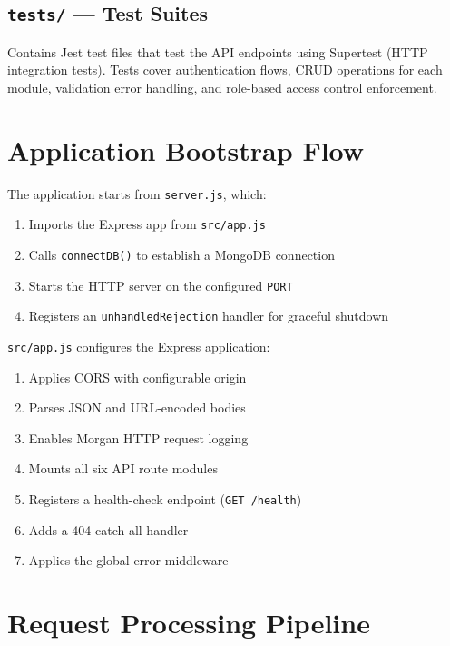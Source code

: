 \documentclass[12pt,a4paper]{article}
\begin{document}
\subsection{\texttt{tests/} --- Test Suites}

Contains Jest test files that test the API endpoints using Supertest (HTTP integration tests). Tests cover authentication flows, CRUD operations for each module, validation error handling, and role-based access control enforcement.

\section{Application Bootstrap Flow}

The application starts from \texttt{server.js}, which:

\begin{enumerate}
  \item Imports the Express app from \texttt{src/app.js}
  \item Calls \texttt{connectDB()} to establish a MongoDB connection
  \item Starts the HTTP server on the configured \texttt{PORT}
  \item Registers an \texttt{unhandledRejection} handler for graceful shutdown
\end{enumerate}

\texttt{src/app.js} configures the Express application:

\begin{enumerate}
  \item Applies CORS with configurable origin
  \item Parses JSON and URL-encoded bodies
  \item Enables Morgan HTTP request logging
  \item Mounts all six API route modules
  \item Registers a health-check endpoint (\texttt{GET /health})
  \item Adds a 404 catch-all handler
  \item Applies the global error middleware
\end{enumerate}

\section{Request Processing Pipeline}
\end{document}
